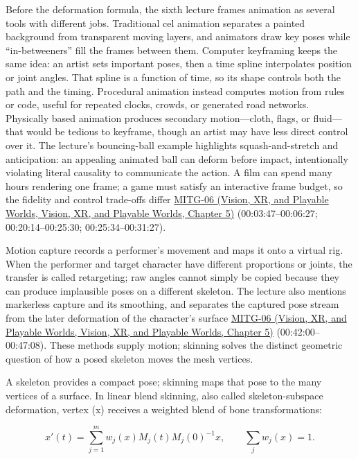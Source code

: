 Before the deformation formula, the sixth lecture frames animation as several tools with different jobs. Traditional cel animation separates a painted background from transparent moving layers, and animators draw key poses while ``in-betweeners'' fill the frames between them. Computer keyframing keeps the same idea: an artist sets important poses, then a time spline interpolates position or joint angles. That spline is a function of time, so its shape controls both the path and the timing. Procedural animation instead computes motion from rules or code, useful for repeated clocks, crowds, or generated road networks. Physically based animation produces secondary motion---cloth, flags, or fluid---that would be tedious to keyframe, though an artist may have less direct control over it. The lecture's bouncing-ball example highlights squash-and-stretch and anticipation: an appealing animated ball can deform before impact, intentionally violating literal causality to communicate the action. A film can spend many hours rendering one frame; a game must satisfy an interactive frame budget, so the fidelity and control trade-offs differ \href{../07-Vision-XR-and-Playable-Worlds/main.pdf\#nameddest=04-visual-computing-ii-ch036-mitg-06---animation-skinningenveloping}{MITG-06 (Vision, XR, and Playable Worlds, Vision, XR, and Playable Worlds, Chapter 5)} (00:03:47--00:06:27; 00:20:14--00:25:30; 00:25:34--00:31:27).

Motion capture records a performer's movement and maps it onto a virtual rig. When the performer and target character have different proportions or joints, the transfer is called retargeting; raw angles cannot simply be copied because they can produce implausible poses on a different skeleton. The lecture also mentions markerless capture and its smoothing, and separates the captured pose stream from the later deformation of the character's surface \href{../07-Vision-XR-and-Playable-Worlds/main.pdf\#nameddest=04-visual-computing-ii-ch036-mitg-06---animation-skinningenveloping}{MITG-06 (Vision, XR, and Playable Worlds, Vision, XR, and Playable Worlds, Chapter 5)} (00:42:00--00:47:08). These methods supply motion; skinning solves the distinct geometric question of how a posed skeleton moves the mesh vertices.

A skeleton provides a compact pose; skinning maps that pose to the many vertices of a surface. In linear blend skinning, also called skeleton-subspace deformation, vertex (x) receives a weighted blend of bone transformations:

\[
x'(t)=\sum_{j=1}^{m}w_j(x)M_j(t)M_j(0)^{-1}x,\qquad \sum_j w_j(x)=1.
\]

